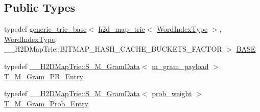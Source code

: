 \subsection*{Public Types}
\begin{DoxyCompactItemize}
\item 
typedef \hyperlink{classuva_1_1smt_1_1bpbd_1_1server_1_1lm_1_1generic__trie__base}{generic\+\_\+trie\+\_\+base}$<$ \hyperlink{classuva_1_1smt_1_1bpbd_1_1server_1_1lm_1_1h2d__map__trie}{h2d\+\_\+map\+\_\+trie}$<$ \hyperlink{classuva_1_1smt_1_1bpbd_1_1server_1_1lm_1_1word__index__trie__base_a64279b5b94c421b25aedaa72e73d013c}{Word\+Index\+Type} $>$, \hyperlink{classuva_1_1smt_1_1bpbd_1_1server_1_1lm_1_1word__index__trie__base_a64279b5b94c421b25aedaa72e73d013c}{Word\+Index\+Type}, \+\_\+\+\_\+\+H2\+D\+Map\+Trie\+::\+B\+I\+T\+M\+A\+P\+\_\+\+H\+A\+S\+H\+\_\+\+C\+A\+C\+H\+E\+\_\+\+B\+U\+C\+K\+E\+T\+S\+\_\+\+F\+A\+C\+T\+O\+R $>$ \hyperlink{classuva_1_1smt_1_1bpbd_1_1server_1_1lm_1_1h2d__map__trie_a2259d6bc61a4d48aa9b535ba70d43818}{B\+A\+S\+E}
\item 
typedef \hyperlink{structuva_1_1smt_1_1bpbd_1_1server_1_1lm_1_1_____h2_d_map_trie_1_1_s___m___gram_data}{\+\_\+\+\_\+\+H2\+D\+Map\+Trie\+::\+S\+\_\+\+M\+\_\+\+Gram\+Data}$<$ \hyperlink{namespaceuva_1_1smt_1_1bpbd_1_1server_1_1lm_1_1m__grams_a1422aa6b3f3cb9377916d20e9bf16c0a}{m\+\_\+gram\+\_\+payload} $>$ \hyperlink{classuva_1_1smt_1_1bpbd_1_1server_1_1lm_1_1h2d__map__trie_a5cfbfeaf2fb49b69d3b80a5f0a33bffb}{T\+\_\+\+M\+\_\+\+Gram\+\_\+\+P\+B\+\_\+\+Entry}
\item 
typedef \hyperlink{structuva_1_1smt_1_1bpbd_1_1server_1_1lm_1_1_____h2_d_map_trie_1_1_s___m___gram_data}{\+\_\+\+\_\+\+H2\+D\+Map\+Trie\+::\+S\+\_\+\+M\+\_\+\+Gram\+Data}$<$ \hyperlink{namespaceuva_1_1smt_1_1bpbd_1_1server_a01e9ea4de9c226f4464862e84ff0bbcc}{prob\+\_\+weight} $>$ \hyperlink{classuva_1_1smt_1_1bpbd_1_1server_1_1lm_1_1h2d__map__trie_a54dc925858461c06d788b62ab860a81b}{T\+\_\+\+M\+\_\+\+Gram\+\_\+\+Prob\+\_\+\+Entry}
\end{DoxyCompactItemize}
